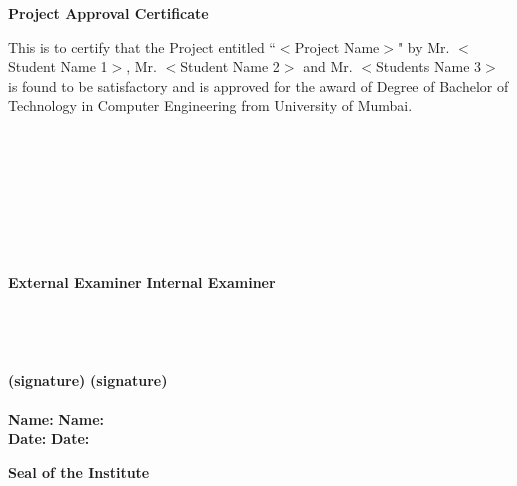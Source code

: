 \newpage
\thispagestyle{empty}
\vspace*{0.2cm}
\vspace{1cm}
\begin{center}
 \large\textbf{Project Approval Certificate}
\end{center}
\vspace{2cm}
This is to certify that the Project entitled ``$<$Project Name$>$" by Mr. $<$Student Name 1$>$, Mr. $<$Student Name 2$>$ and Mr. $<$Students Name 3$>$ is found to be satisfactory and is approved for the award of Degree of Bachelor of Technology in Computer Engineering from University of Mumbai.\\
\\
\\
\\
\\
\\
\\
\\
\\
\textbf {External Examiner} \hspace{2.85in} \textbf{Internal Examiner}\\ 
\\
\\
\\
\\
\textbf {(signature)} \hspace{3.5in} \textbf{(signature)} \\
\\
\vspace{1cm}
\textbf {Name:} \hspace{3.8in} \textbf{Name:}\\ 
\vspace{2cm}
\textbf {Date:} \hspace{3.9in} \textbf{Date:}\\ 
\vspace{2cm}
\begin{center}
\textbf{Seal of the Institute}\\
\end{center}

